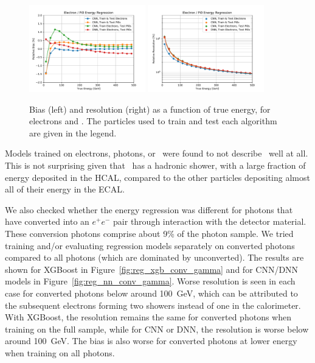 \begin{figure}[htbp]
\centering
\includegraphics[width=0.45\textwidth]{Images/Calo/bias_vs_E_ElePi0Fixed_nn_cross_zoom.pdf}
\includegraphics[width=0.45\textwidth]{Images/Calo/res_vs_E_ElePi0Fixed_nn_cross_fits.pdf}
\caption{Bias (left) and resolution (right) as a function of true energy, for electrons and \pizero.  The particles used to train and test each algorithm are given in the legend.
}
\label{fig:reg_nn_cross_pi0}
\end{figure}

Models trained on electrons, photons, or \pizero\ were found to not describe \chpi\ well at all.  This is not surprising given that \chpi\ has a hadronic shower, with a large fraction of energy deposited in the HCAL, compared to the other particles depositing almost all of their energy in the ECAL.

We also checked whether the energy regression was different for photons that have converted into an $e^{+}e^{-}$ pair through interaction with the detector material.  These conversion photons comprise about 9\% of the photon sample.  We tried training and/or evaluating regression models separately on converted photons compared to all photons (which are dominated by unconverted).  The results are shown for XGBoost in Figure~\ref{fig:reg_xgb_conv_gamma} and for CNN/DNN models in Figure~\ref{fig:reg_nn_conv_gamma}.  Worse resolution is seen in each case for converted photons below around 100~GeV, which can be attributed to the subsequent electrons forming two showers instead of one in the calorimeter.  With XGBoost, the resolution remains the same for converted photons when training on the full sample, while for CNN or DNN, the resolution is worse below around 100~GeV.  The bias is also worse for converted photons at lower energy when training on all photons.

